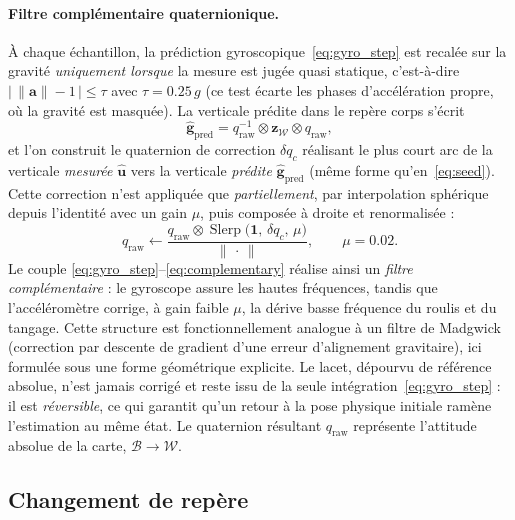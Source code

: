 \documentclass{tropLaClasse}
\begin{document}
\paragraph{Filtre complémentaire quaternionique.}
À chaque échantillon, la prédiction gyroscopique~\eqref{eq:gyro_step} est recalée sur la gravité \emph{uniquement lorsque} la mesure est jugée quasi statique, c'est-à-dire $\big|\,\lVert\mathbf{a}\rVert-1\,\big|\le\tau$ avec $\tau=0{.}25\,g$ (ce test écarte les phases d'accélération propre, où la gravité est masquée). La verticale prédite dans le repère corps s'écrit
\begin{equation}
\hat{\mathbf{g}}_{\text{pred}}=q_{\text{raw}}^{-1}\otimes\mathbf{z}_{\mathcal W}\otimes q_{\text{raw}},
\end{equation}
et l'on construit le quaternion de correction $\delta q_c$ réalisant le plus court arc de la verticale \emph{mesurée} $\hat{\mathbf{u}}$ vers la verticale \emph{prédite} $\hat{\mathbf{g}}_{\text{pred}}$ (même forme qu'en~\eqref{eq:seed}). Cette correction n'est appliquée que \emph{partiellement}, par interpolation sphérique depuis l'identité avec un gain $\mu$, puis composée à droite et renormalisée :
\begin{equation}
q_{\text{raw}}\leftarrow\frac{q_{\text{raw}}\otimes\operatorname{Slerp}\!\big(\mathbf{1},\,\delta q_c,\,\mu\big)}{\big\lVert\,\cdot\,\big\rVert},
\qquad \mu=0{.}02 .
\label{eq:complementary}
\end{equation}
Le couple \eqref{eq:gyro_step}--\eqref{eq:complementary} réalise ainsi un \emph{filtre complémentaire} : le gyroscope assure les hautes fréquences, tandis que l'accéléromètre corrige, à gain faible $\mu$, la dérive basse fréquence du roulis et du tangage. Cette structure est fonctionnellement analogue à un filtre de Madgwick (correction par descente de gradient d'une erreur d'alignement gravitaire), ici formulée sous une forme géométrique explicite. Le lacet, dépourvu de référence absolue, n'est jamais corrigé et reste issu de la seule intégration~\eqref{eq:gyro_step} : il est \emph{réversible}, ce qui garantit qu'un retour à la pose physique initiale ramène l'estimation au même état. Le quaternion résultant $q_{\text{raw}}$ représente l'attitude absolue de la carte, $\mathcal B\rightarrow\mathcal W$.

\subsection{Changement de repère}
\label{subsec:calib}
\end{document}
